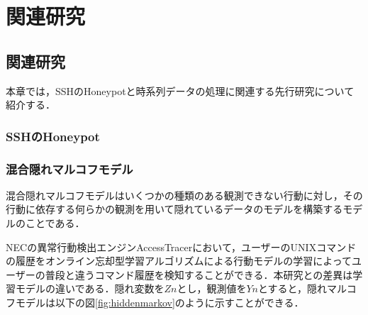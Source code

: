 \chapter{関連研究}
 \label{rela}

\section{関連研究}
本章では，SSHのHoneypotと時系列データの処理に関連する先行研究について紹介する．

\subsection{SSHのHoneypot}

\subsection{混合隠れマルコフモデル}
混合隠れマルコフモデルはいくつかの種類のある観測できない行動に対し，その行動に依存する何らかの観測を用いて隠れているデータのモデルを構築するモデルのことである．


NECの異常行動検出エンジンAccessTracer\cite{AccessTracer}において，ユーザーのUNIXコマンドの履歴をオンライン忘却型学習アルゴリズムによる行動モデルの学習によってユーザーの普段と違うコマンド履歴を検知することができる．本研究との差異は学習モデルの違いである．隠れ変数を$ Zn $とし，観測値を$ Yn $とすると，隠れマルコフモデルは以下の図\ref{fig:hiddenmarkov}のように示すことができる．

